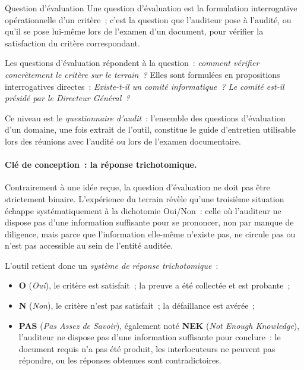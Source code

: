 \begin{boxdef}{Question d'évaluation}
Une question d'évaluation est la formulation interrogative opérationnelle d'un
critère~; c'est la question que l'auditeur pose à l'audité, ou qu'il se pose
lui-même lors de l'examen d'un document, pour vérifier la satisfaction du
critère correspondant.
\end{boxdef}

Les questions d'évaluation répondent à la question~: \emph{comment vérifier
concrètement le critère sur le terrain~?} Elles sont formulées en propositions
interrogatives directes~: \emph{Existe-t-il un comité informatique~? Le comité
est-il présidé par le Directeur Général~?}

Ce niveau est le \emph{questionnaire d'audit}~: l'ensemble des questions
d'évaluation d'un domaine, une fois extrait de l'outil, constitue le guide
d'entretien utilisable lors des réunions avec l'audité ou lors de l'examen
documentaire.

\paragraph{Clé de conception~: la réponse trichotomique.}
Contrairement à une idée reçue, la question d'évaluation ne doit pas être
strictement binaire. L'expérience du terrain révèle qu'une troisième situation
échappe systématiquement à la dichotomie Oui/Non~: celle où l'auditeur ne
dispose pas d'une information suffisante pour se prononcer, non par manque
de diligence, mais parce que l'information elle-même n'existe pas, ne circule
pas ou n'est pas accessible au sein de l'entité auditée.

L'outil retient donc un \emph{système de réponse trichotomique}~:

\begin{itemize}
  \item \textbf{O} (\emph{Oui}), le critère est satisfait~; la preuve a été
        collectée et est probante~;
  \item \textbf{N} (\emph{Non}), le critère n'est pas satisfait~; la
        défaillance est avérée~;
  \item \textbf{PAS} (\emph{Pas Assez de Savoir}), également noté
        \textbf{NEK} (\emph{Not Enough Knowledge}), l'auditeur ne dispose pas
        d'une information suffisante pour conclure~: le document requis n'a pas
        été produit, les interlocuteurs ne peuvent pas répondre, ou les réponses
        obtenues sont contradictoires.
\end{itemize}

